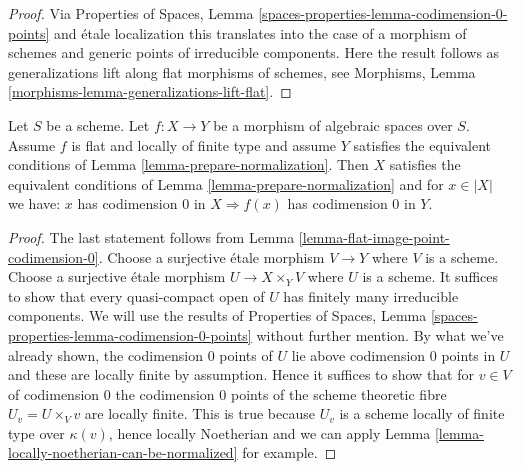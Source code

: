 \begin{proof}
Via Properties of Spaces, Lemma
\ref{spaces-properties-lemma-codimension-0-points} and \'etale localization
this translates into the case of a morphism of schemes and generic points
of irreducible components. Here the result follows as generalizations lift
along flat morphisms of schemes, see
Morphisms, Lemma \ref{morphisms-lemma-generalizations-lift-flat}.
\end{proof}

\begin{lemma}
\label{lemma-flat-locally-finite-type-points-codimension-0}
Let $S$ be a scheme. Let $f : X \to Y$ be a morphism of algebraic
spaces over $S$. Assume $f$ is flat and locally of finite type and
assume $Y$ satisfies the equivalent conditions of
Lemma \ref{lemma-prepare-normalization}.
Then $X$ satisfies the equivalent conditions of
Lemma \ref{lemma-prepare-normalization} and for $x \in |X|$ we have:
$x$ has codimension $0$ in $X \Rightarrow f(x)$ has codimension $0$ in $Y$.
\end{lemma}

\begin{proof}
The last statement follows from
Lemma \ref{lemma-flat-image-point-codimension-0}.
Choose a surjective \'etale morphism $V \to Y$ where $V$ is a scheme.
Choose a surjective \'etale morphism $U \to X \times_Y V$ where $U$
is a scheme. It suffices to show that every quasi-compact open
of $U$ has finitely many irreducible components.
We will use the results of
Properties of Spaces, Lemma \ref{spaces-properties-lemma-codimension-0-points}
without further mention. By what we've
already shown, the codimension $0$ points of $U$ lie above
codimension $0$ points in $U$ and these are locally finite by
assumption. Hence it suffices to show that for $v \in V$ of codimension $0$
the codimension $0$ points of the scheme theoretic fibre $U_v = U \times_V v$
are locally finite. This is true because $U_v$ is a scheme
locally of finite type over $\kappa(v)$, hence locally Noetherian
and we can apply Lemma \ref{lemma-locally-noetherian-can-be-normalized}
for example.
\end{proof}

